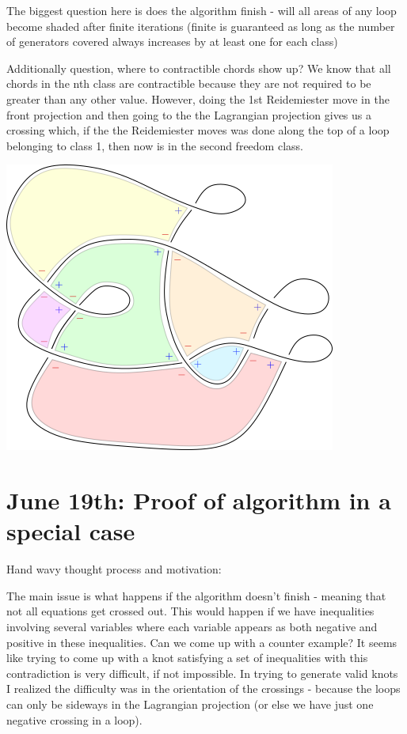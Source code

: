 \documentclass[11pt]{amsart}
\begin{document}
The biggest question here is does the algorithm finish - will all areas of any loop become shaded after finite iterations (finite is guaranteed as long as the number of generators covered always increases by at least one for each class)

Additionally question, where to contractible chords show up? We know that all chords in the nth class are contractible because they are not required to be greater than any other value. However, doing the 1st Reidemiester move in the front projection and then going to the the Lagrangian projection gives us a crossing which, if the the Reidemiester moves was done along the top of a loop belonging to class 1, then now is in the second freedom class. 


\includegraphics[]{General Information/path184.png}



\section{June 19th: Proof of algorithm in a special case}

Hand wavy thought process and motivation: 

The main issue is what happens if the algorithm doesn't finish - meaning that not all equations get crossed out. This would happen if we have inequalities involving several variables where each variable appears as both negative and positive in these inequalities. Can we come up with a counter example? It seems like trying to come up with a knot satisfying a set of inequalities with this contradiction is very difficult, if not impossible. In trying to generate valid knots I realized the difficulty was in the orientation of the crossings - because the loops can only be sideways in the Lagrangian projection (or else we have just one negative crossing in a loop). 
\end{document}
